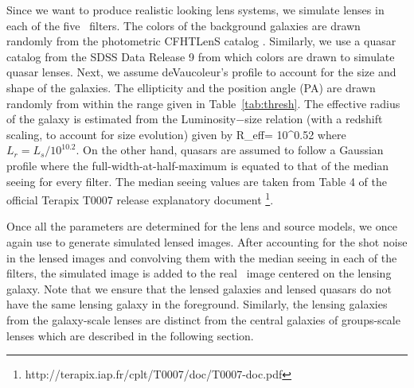 \documentclass[useAMS,usenatbib,a4paper]{mn2e}
\begin{document}
Since we want to produce realistic looking lens systems, we simulate lenses in
each of the five \cfhtls~filters. The colors of the background galaxies are drawn
randomly from the photometric CFHTLenS catalog
\citep{Hildebrandt2012,Erben2013}.  Similarly, we use a quasar catalog from the
SDSS Data Release 9 \citep{Paris2012} from which colors are drawn to simulate
quasar lenses.  Next, we assume deVaucoleur's profile to account for the size
and shape of the galaxies. The ellipticity and the position angle (PA) are drawn
randomly from within the range given in Table~\ref{tab:thresh}. The effective
radius of the galaxy is estimated from the Luminosity$-$size relation
\citep{Bernardi2003} (with a redshift scaling, to account for size
evolution) given by
\be
R_{\rm eff}= 10^{0.52} 
\ee
where $L_r=L_s/10^{10.2}$. On the other hand, quasars are assumed to follow a
Gaussian profile where the full-width-at-half-maximum is equated to that of the median seeing for
every filter. The median seeing values are taken from Table 4 of the official
Terapix T0007 release explanatory document \footnote{
    http://terapix.iap.fr/cplt/T0007/doc/T0007-doc.pdf}.

Once all the parameters are determined for the lens and source models, we once
again use \gravlens to generate simulated lensed images.  After accounting for the shot
noise in the lensed images and convolving them with the median seeing in each of
the filters, the simulated image is added to the real \cfhtls~image centered
on the lensing galaxy. Note that we ensure that the lensed galaxies and
lensed quasars do not have the same lensing galaxy in the foreground. Similarly,
the lensing galaxies from the galaxy-scale lenses are distinct from the central
galaxies of groups-scale lenses which are described in the following section.
\end{document}
